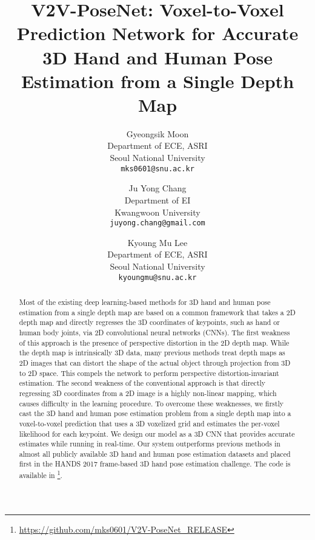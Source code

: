 \documentclass[10pt,twocolumn,letterpaper]{article}
\begin{document}
\title{V2V-PoseNet: Voxel-to-Voxel Prediction Network for Accurate 3D Hand and Human Pose Estimation from a Single Depth Map}

\author{Gyeongsik Moon\\
Department of ECE, ASRI\\
Seoul National University\\
{\tt\small mks0601@snu.ac.kr}
\and
Ju Yong Chang\\
Department of EI\\
Kwangwoon University\\
{\tt\small juyong.chang@gmail.com}
\and
Kyoung Mu Lee\\
Department of ECE, ASRI\\
Seoul National University\\
{\tt\small kyoungmu@snu.ac.kr}
}

\maketitle

\begin{abstract}
Most of the existing deep learning-based methods for 3D hand and human pose estimation from a single depth map are based on a common framework that takes a 2D depth map and directly regresses the 3D coordinates of keypoints, such as hand or human body joints, via 2D convolutional neural networks (CNNs). The first weakness of this approach is the presence of perspective distortion in the 2D depth map. While the depth map is intrinsically 3D data, many previous methods treat depth maps as 2D images that can distort the shape of the actual object through projection from 3D to 2D space. This compels the network to perform perspective distortion-invariant estimation. The second weakness of the conventional approach is that directly regressing 3D coordinates from a 2D image is a highly non-linear mapping, which causes difficulty in the learning procedure. To overcome these weaknesses, we firstly cast the 3D hand and human pose estimation problem from a single depth map into a voxel-to-voxel prediction that uses a 3D voxelized grid and estimates the per-voxel likelihood for each keypoint. We design our model as a 3D CNN that provides accurate estimates while running in real-time. Our system outperforms previous methods in almost all publicly available 3D hand and human pose estimation datasets and placed first in the HANDS 2017 frame-based 3D hand pose estimation challenge. The code is available in \footnote{\url{https://github.com/mks0601/V2V-PoseNet_RELEASE}}.
\end{abstract}
\end{document}
